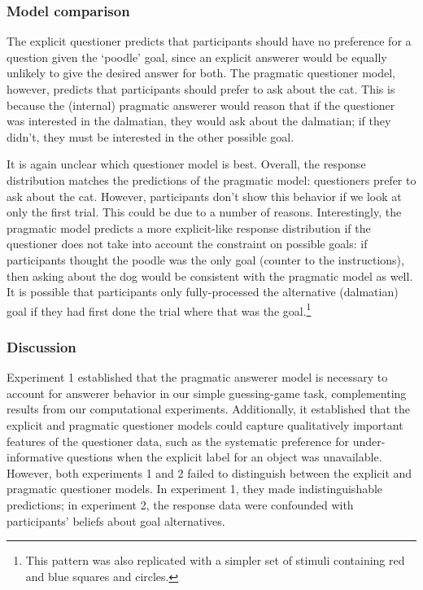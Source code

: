 \documentclass[12pt, floatsintext, man]{apa6}
\begin{document}
\subsubsection{Model comparison}

The explicit questioner predicts that participants should have no preference for a question given the `poodle' goal, since an explicit answerer would be equally unlikely to give the desired answer for both. The pragmatic questioner model, however, predicts that participants should prefer to ask about the cat. This is because the (internal) pragmatic answerer would reason that if the questioner was interested in the dalmatian, they would ask about the dalmatian; if they didn't, they must be interested in the other possible goal. 

It is again unclear which questioner model is best. Overall, the response distribution matches the predictions of the pragmatic model: questioners prefer to ask about the cat. 
However, participants don't show this behavior if we look at only the first trial.
This could be due to a number of reasons.
Interestingly, the pragmatic model predicts a more explicit-like response distribution if the questioner does not take into account the constraint on possible goals: if participants thought the poodle was the only goal (counter to the instructions), then asking about the dog would be consistent with the pragmatic model as well. 
It is possible that participants only fully-processed the alternative (dalmatian) goal if they had first done the trial where that was the goal.\footnote{This pattern was also replicated with a simpler set of stimuli containing red and blue squares and circles.}

\subsubsection{Discussion}

Experiment 1 established that the pragmatic answerer model is necessary to account for answerer behavior in our simple guessing-game task, complementing  results from our computational experiments. Additionally, it established that the explicit and pragmatic questioner models could capture qualitatively important features of the questioner data, such as the systematic preference for under-informative questions when the explicit label for an object was unavailable. However, both experiments 1 and 2 failed to distinguish between the explicit and pragmatic questioner models. In experiment 1, they made indistinguishable predictions; in experiment 2, the response data were confounded with participants' beliefs about goal alternatives. 
\end{document}

